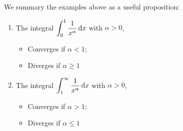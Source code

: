 We summary the examples above as a useful proposition:
\begin{proposition}\quad
\begin{enumerate}
\item
The integral $\displaystyle\int_0^1\frac{1}{x^{\alpha}}\,\mathrm{d} x$ with $\alpha>0$,
\begin{itemize}
\item
Converges if $\alpha<1$;
\item
Diverges if $\alpha\ge1$
\end{itemize}
\item
The integral $\displaystyle\int_1^\infty\frac{1}{x^{\alpha}}\,\mathrm{d} x$ with $\alpha>0$,
\begin{itemize}
\item
Converges if $\alpha>1$;
\item
Diverges if $\alpha\le1$
\end{itemize}
\end{enumerate}
\end{proposition}





